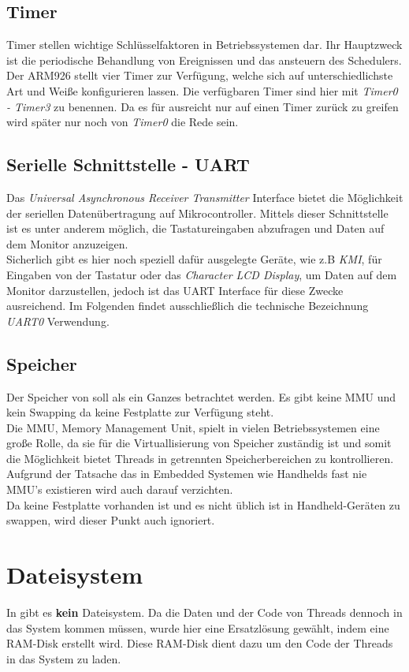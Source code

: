 \subsection{Timer}
Timer stellen wichtige Schl\"usselfaktoren in Betriebssystemen dar. Ihr Hauptzweck ist die periodische Behandlung von Ereignissen und das ansteuern des Schedulers. \\
Der ARM926 stellt vier Timer zur Verf\"ugung, welche sich auf unterschiedlichste Art und Wei\ss e konfigurieren lassen. Die verf\"ugbaren Timer sind hier mit \textit{Timer0 - Timer3} zu benennen\parencite[vgl.][262]{archManI}. Da es f\"ur \mops ausreicht nur auf einen Timer zur\"uck zu greifen wird sp\"ater nur noch von \textit{Timer0} die Rede sein.
\subsection{Serielle Schnittstelle - UART}
Das \textit{Universal Asynchronous Receiver Transmitter} Interface bietet die M\"oglichkeit der seriellen Daten\"ubertragung auf Mikrocontroller. Mittels dieser Schnittstelle ist es unter anderem m\"oglich, die Tastatureingaben abzufragen und Daten auf dem Monitor anzuzeigen. \\
Sicherlich gibt es hier noch speziell daf\"ur ausgelegte Ger\"ate, wie z.B \textit{KMI}, f\"ur Eingaben von der Tastatur oder das \textit{Character LCD Display}, um Daten auf dem Monitor darzustellen,  jedoch ist das UART Interface f\"ur diese Zwecke ausreichend. Im Folgenden findet ausschlie\ss lich die technische Bezeichnung \textit{UART0} Verwendung.
\subsection{Speicher}
Der Speicher von \mops soll als ein Ganzes betrachtet werden. Es gibt keine MMU und kein Swapping da keine Festplatte zur Verf\"ugung steht.\\
Die MMU, Memory Management Unit, spielt in vielen Betriebssystemen eine gro\ss e Rolle, da sie f\"ur die Virtuallisierung von Speicher zust\"andig ist und somit die M\"oglichkeit bietet Threads in getrennten Speicherbereichen zu kontrollieren. Aufgrund der Tatsache das in Embedded Systemen wie Handhelds fast nie MMU's existieren wird auch \mops darauf verzichten.\\
Da keine Festplatte vorhanden ist und es nicht \"ublich ist in Handheld-Ger\"aten zu swappen, wird dieser Punkt auch ignoriert.

\section{Dateisystem}
In \mops gibt es \textbf{kein} Dateisystem. Da die Daten und der Code von Threads dennoch in das System kommen m\"ussen, wurde hier eine Ersatzl\"osung gew\"ahlt, indem eine RAM-Disk erstellt wird. Diese RAM-Disk dient dazu um den Code der Threads in das System zu laden.


